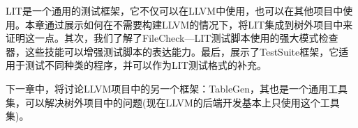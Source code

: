 LIT是一个通用的测试框架，它不仅可以在LLVM中使用，也可以在其他项目中使用。本章通过展示如何在不需要构建LLVM的情况下，将LIT集成到树外项目中来证明这一点。其次，我们了解了FileCheck—LIT测试脚本使用的强大模式检查器，这些技能可以增强测试脚本的表达能力。最后，展示了TestSuite框架，它适用于测试不同种类的程序，并可以作为LIT测试格式的补充。

下一章中，将讨论LLVM项目中的另一个框架：TableGen，其也是一个通用工具集，可以解决树外项目中的问题(现在LLVM的后端开发基本上只使用这个工具集)。